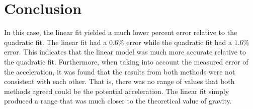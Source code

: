\documentclass[12pt]{article}
\begin{document}
\section{Conclusion}

In this case, the linear fit yielded a much lower percent error relative to the quadratic fit. The linear fit had a $0.6\%$ error while the quadratic fit had a $1.6\%$ error. This indicates that the linear model was much more accurate relative to the quadratic fit. Furthermore, when taking into account the measured error of the acceleration, it was found that the results from both methods were not consistent with each other. That is, there was no range of values that both methods agreed could be the potential acceleration. The linear fit simply produced a range that was much closer to the theoretical value of gravity.
\end{document}
